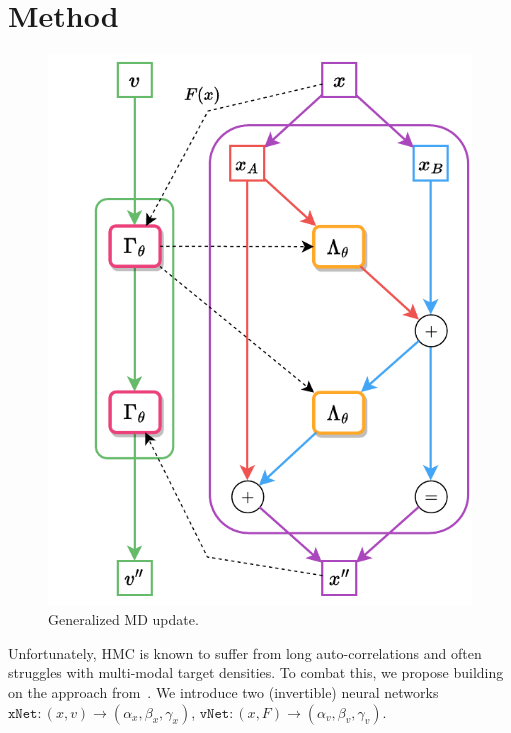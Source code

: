 \documentclass[a4paper,11pt]{article}
\begin{document}
\section{Method}
\label{sec:method}
%
\begin{figure}
    \begin{center}
        \caption{\label{fig:lf-layer}Generalized MD update.} 
        \includegraphics[width=\linewidth]{assets/leapfrog-layer.pdf}
  \end{center}
\end{figure}
%
Unfortunately, HMC is known to suffer from long auto-correlations and often
struggles with multi-modal target densities.
%
To combat this, we propose building on the approach from~\cite{foreman_learning_2019,foreman_deep_2021,foreman_leapfroglayers_2022}. 
%
We introduce two (invertible) neural networks $\texttt{xNet}: (x, v) \rightarrow (\alpha_{x}, \beta_{x}, \gamma_{x})$, $\texttt{vNet}: (x, F) \rightarrow (\alpha_{v}, \beta_{v}, \gamma_{v})$.
%
%
\end{document}

